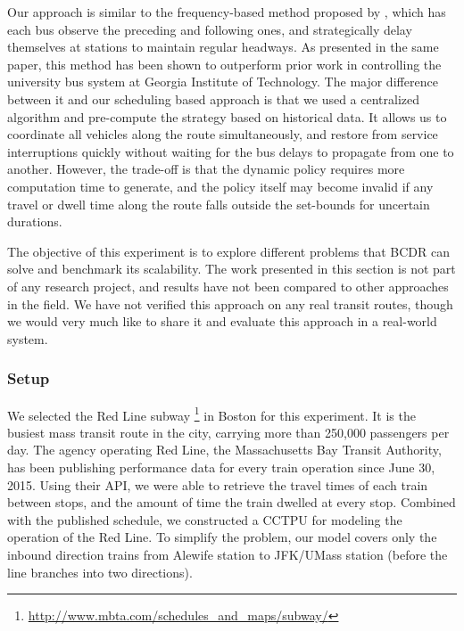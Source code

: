 \documentclass[jair,twoside,11pt,theapa]{article}
\begin{document}
Our approach is similar to the frequency-based method proposed by
, which has each bus observe the preceding and
following ones, and strategically delay themselves at stations to maintain
regular headways. As presented in the same paper, this method has been shown to
outperform prior work in controlling the university bus system at Georgia
Institute of Technology. The major difference between it and our scheduling
based approach is that we used a centralized algorithm and pre-compute the
strategy based on historical data. It allows us to coordinate all vehicles along
the route simultaneously, and restore from service interruptions quickly without
waiting for the bus delays to propagate from one to another. However, the
trade-off is that the dynamic policy requires more computation time to
generate, and the policy itself may become invalid if any travel or dwell time
along the route falls outside the set-bounds for uncertain durations.


The objective of this experiment is to explore different problems that
BCDR can solve and benchmark its scalability. The work presented in this section
is not part of any research project, and results have not been compared to other
approaches in the field. We have not verified this approach on any real transit
routes, though we would very much like to share it and evaluate this approach in
a real-world system.


\subsubsection{Setup}


We selected the Red Line subway \footnote{\url{http://www.mbta.com/schedules_and_maps/subway/}} in Boston for this experiment. It is the busiest
mass transit route in the city, carrying more than 250,000 passengers per day.
The agency operating Red Line, the Massachusetts Bay Transit Authority, has been
publishing performance data for every train operation since June 30, 2015. Using
their API, we were able to retrieve the travel times of each train between
stops, and the amount of time the train dwelled at every stop. Combined with the
published schedule, we constructed a CCTPU for modeling the operation of the Red
Line. To simplify the problem, our model covers only the inbound direction
trains from Alewife station to JFK/UMass station (before the line branches into
two directions).
\end{document}
